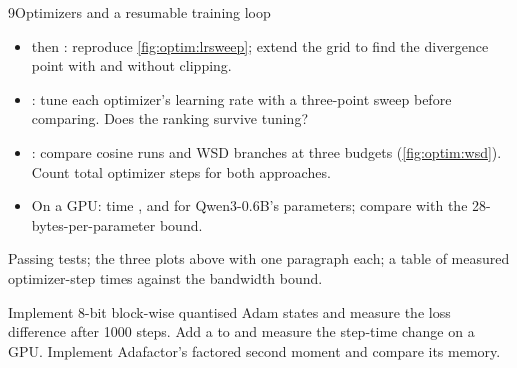 \begin{labbox}{9}{Optimizers and a resumable training loop}
\begin{itemize}
  \item {} then : reproduce
        \cref{fig:optim:lrsweep}; extend the grid to find the divergence point with and without
        clipping.
  \item {}: tune each optimizer's learning rate with a three-point sweep
        before comparing. Does the ranking survive tuning?
  \item {}: compare cosine runs and WSD branches at three budgets
        (\cref{fig:optim:wsd}). Count total optimizer steps for both approaches.
  \item On a GPU: time ,  and
         for Qwen3-0.6B's parameters; compare with the
        28-bytes-per-parameter bound.
\end{itemize}

Passing tests; the three plots above with one paragraph each; a table of measured optimizer-step
times against the bandwidth bound.

Implement 8-bit block-wise quantised Adam states and measure the loss difference after 1000
steps. Add a  to  and measure the step-time change on a
GPU. Implement Adafactor's factored second moment and compare its memory.
\end{labbox}
